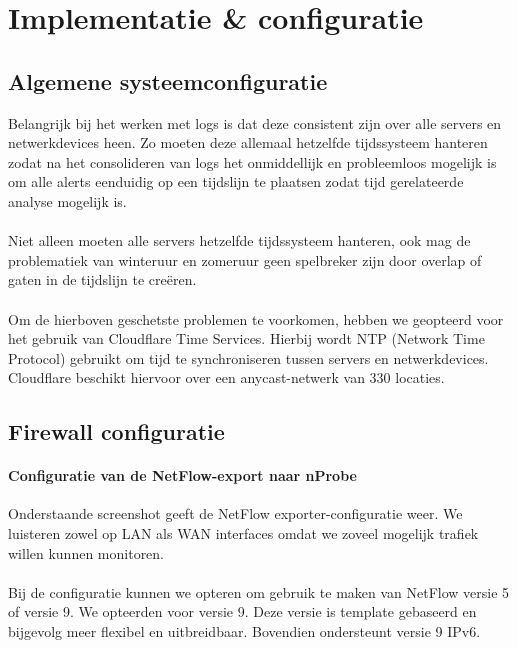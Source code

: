 \section{Implementatie \& configuratie}
\subsection{Algemene systeemconfiguratie}
Belangrijk bij het werken met logs is dat deze consistent zijn over alle servers en netwerkdevices heen. Zo moeten deze allemaal hetzelfde tijdssysteem hanteren zodat na het consolideren van logs het onmiddellijk en probleemloos mogelijk is om alle alerts eenduidig op een tijdslijn te plaatsen zodat tijd gerelateerde analyse mogelijk is.

\paragraph{}
Niet alleen moeten alle servers hetzelfde tijdssysteem hanteren, ook mag de problematiek van winteruur en zomeruur geen spelbreker zijn door overlap of gaten in de tijdslijn te creëren.

\paragraph{}
Om de hierboven geschetste problemen te voorkomen, hebben we geopteerd voor het gebruik van Cloudflare Time Services. Hierbij wordt NTP (Network Time Protocol) gebruikt om tijd te synchroniseren tussen servers en netwerkdevices. Cloudflare beschikt hiervoor over een anycast-netwerk van 330 locaties.

\subsection{Firewall configuratie}

\paragraph{Configuratie van de NetFlow-export naar nProbe}
Onderstaande screenshot geeft de NetFlow exporter-configuratie weer.
We luisteren zowel op LAN als WAN interfaces omdat we zoveel mogelijk trafiek willen kunnen monitoren.

\paragraph{}
Bij de configuratie kunnen we opteren om gebruik te maken van NetFlow versie 5 of versie 9. We opteerden voor versie 9. Deze versie is template gebaseerd en bijgevolg meer flexibel en uitbreidbaar. Bovendien ondersteunt versie 9 IPv6.

